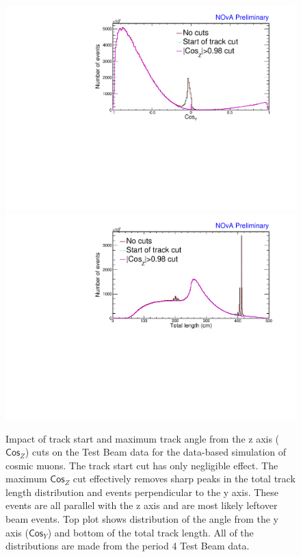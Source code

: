 \begin{enumerate}
\begin{figure}[!ht]
\includegraphics[width=\textwidth]{Plots/TBCalibration/DBSim_SelectionComparisonCosZCut_CosY.pdf}
\includegraphics[width=\textwidth]{Plots/TBCalibration/DBSim_SelectionComparisonCosZCut_TotLength.pdf}
\caption[Track start and $\textsf{Cos}_Z$ cut for data-based simulation selection]{Impact of track start and maximum track angle from the z axis ($\textsf{Cos}_Z$) cuts on the Test Beam data for the data-based simulation of cosmic muons. The track start cut has only negligible effect. The maximum $\textsf{Cos}_Z$ cut effectively removes sharp peaks in the total track length distribution and events perpendicular to the y axis. These events are all parallel with the z axis and are most likely leftover beam events. Top plot shows distribution of the angle from the y axis ($\textsf{Cos}_Y$) and bottom of the total track length. All of the distributions are made from the period 4 Test Beam data.}
\label{fig:DataBasedSimCosZSelectionComparison}
\end{figure}


\end{enumerate}
